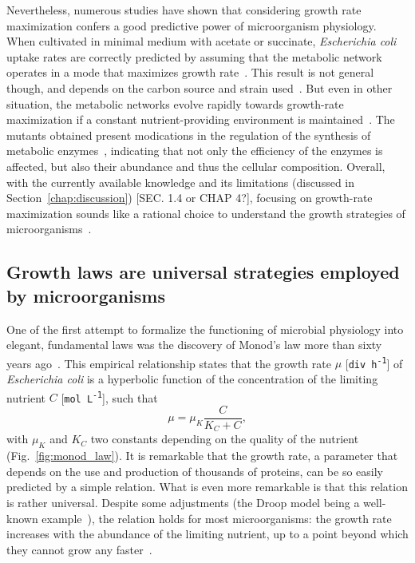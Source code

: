 Nevertheless, numerous studies have shown that considering growth rate maximization confers a good predictive power of microorganism physiology.
When cultivated in minimal medium with acetate or succinate, \textit{Escherichia coli} uptake rates are correctly predicted by assuming that the metabolic network operates in a mode that maximizes growth rate~\cite{edwards_silico_2001}.
This result is not general though, and depends on the carbon source and strain used~\cite{ibarra_escherichia_2002}.
But even in other situation, the metabolic networks evolve rapidly towards growth-rate maximization if a constant nutrient-providing environment is maintained~\cite{ibarra_escherichia_2002}.
The mutants obtained present modications in the regulation of the synthesis of metabolic enzymes~\cite{lewis_omic_2010}, indicating that not only the efficiency of the enzymes is affected, but also their abundance and thus the cellular composition.
Overall, with the currently available knowledge and its limitations (discussed in Section~\ref{chap:discussion}) [SEC. 1.4 or CHAP 4?], focusing on growth-rate maximization sounds like a rational choice to understand the growth strategies of microorganisms~\cite{molenaar_shifts_2009}.

\subsection{Growth laws are universal strategies employed by microorganisms}

One of the first attempt to formalize the functioning of microbial physiology into elegant, fundamental laws was the discovery of Monod's law more than sixty years ago~\cite{monod_growth_1949}.
This empirical relationship states that the growth rate $\mu$ [\texttt{div h\textsuperscript{-1}}] of \textit{Escherichia coli} is a hyperbolic function of the concentration of the limiting nutrient $C$ [\texttt{mol L\textsuperscript{-1}}], such that
\begin{equation}
\label{eq:monod_law}
\mu = \mu_K \frac{C}{K_C + C},
\end{equation}
with $\mu_K$ and $K_C$ two constants depending on the quality of the nutrient (Fig.~\ref{fig:monod_law}).
It is remarkable that the growth rate, a parameter that depends on the use and production of thousands of proteins, can be so easily predicted by a simple relation.
What is even more remarkable is that this relation is rather universal.
Despite some adjustments (the Droop model being a well-known example~\cite{droop_thoughts_1973}), the relation holds for most microorganisms: the growth rate increases with the abundance of the limiting nutrient, up to a point beyond which they cannot grow any faster~\cite{koch_why_1988}.

